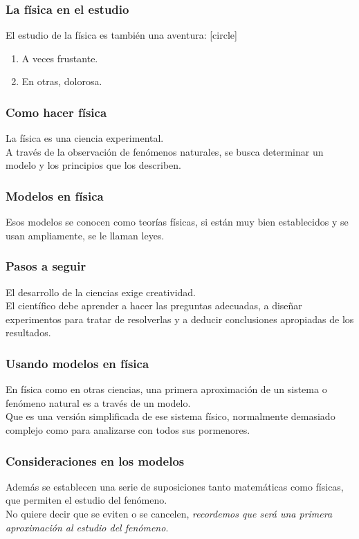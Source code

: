 \begin{frame}[plain]
    \begin{figure}
    
    \end{figure}
\end{frame}
\begin{frame}
\frametitle{La física en el estudio}
El estudio de la física es también una aventura:
\pause
{}
[circle]
\begin{enumerate}[<+->]
\item A veces frustante.
\item En otras, dolorosa.
\end{enumerate}
\end{frame}
\begin{frame}
\frametitle{Como hacer física}
La física es una ciencia experimental.
\\
\bigskip
A través de la observación de fenómenos naturales, se busca determinar un modelo y los principios que los describen.
\end{frame}
\begin{frame}   
\frametitle{Modelos en física}
Esos modelos se conocen como teorías físicas, si están muy bien establecidos y se usan ampliamente, se le llaman leyes.
\end{frame}
\begin{frame}
\frametitle{Pasos a seguir}
El desarrollo de la ciencias exige creatividad.
\\
\bigskip
\pause
El científico debe aprender a hacer las preguntas adecuadas, a diseñar experimentos para tratar de resolverlas y a deducir conclusiones apropiadas de los resultados.
\end{frame}
\begin{frame}
\frametitle{Usando modelos en física}
En física como en otras ciencias, una primera aproximación de un sistema o fenómeno natural es a través de un modelo.
\\
\bigskip
\pause
Que es una versión simplificada de ese sistema físico, normalmente demasiado complejo como para analizarse con todos sus pormenores.
\end{frame}
\begin{frame}
\frametitle{Consideraciones en los modelos}
Además se establecen una serie de suposiciones tanto matemáticas como físicas, que permiten el estudio del fenómeno.
\\
\bigskip
\pause
No quiere decir que se eviten o se cancelen, \emph{recordemos que será una primera aproximación al estudio del fenómeno}.
\end{frame}
